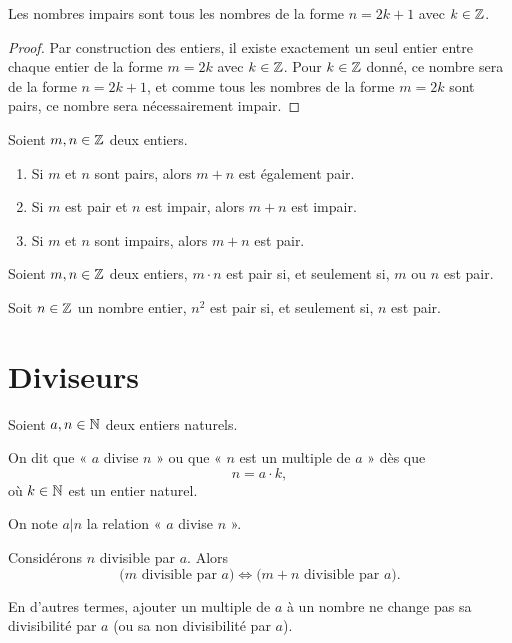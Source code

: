 \documentclass[a4paper, 12pt]{report}
\begin{document}
\begin{thm}
Les nombres impairs sont tous les nombres de la forme $n = 2k + 1$ avec $k \in \mathbb{Z}$. 
\end{thm}

\begin{proof}
Par construction des entiers, il existe exactement un seul entier entre chaque entier de la forme $m = 2k$ avec $k \in \mathbb{Z}$. 
Pour $k \in \mathbb{Z}$ donné, ce nombre sera de la forme $n = 2k +1$, et comme tous les nombres de la forme $m = 2k$ sont pairs,
ce nombre sera nécessairement impair. 
\end{proof}

\begin{thm}
	Soient $m, n\in\mathbb{Z}$ deux entiers.
		\begin{enumerate}
			\item Si $m$ et $n$ sont pairs, alors $m+n$ est également pair.
			\item Si $m$ est pair et $n$ est impair, alors $m+n$ est impair.
			\item Si $m$ et $n$ sont impairs, alors $m+n$ est pair.
		\end{enumerate}
\end{thm}

\begin{thm}
Soient $m, n\in\mathbb{Z}$ deux entiers, $m \cdot n$ est pair si, et seulement si, $m$ ou $n$ est pair.
\end{thm}

\begin{coro}
Soit $n \in \mathbb{Z}$ un nombre entier, $n^2$ est pair si, et seulement si, $n$ est pair.
\end{coro}

\section{Diviseurs}

\begin{defn}
	Soient $a, n \in \mathbb{N}$ deux entiers naturels.
	
	On dit que « $a$ divise $n$ » ou que « $n$ est un multiple de $a$ » dès que
		\[ n = a \cdot k, \]
	où $k\in\mathbb{N}$ est un entier naturel.
\end{defn}

\begin{nota}
	On note $a \big| n$ la relation « $a$ divise $n$ ».
\end{nota}

\begin{prop}
\label{prop:stab}
	Considérons $n$ divisible par $a$. Alors
		\[ \bigl( m \text{ divisible par $a$} \bigr) \iff \bigl( m+n \text{ divisible par $a$} \bigr). \]
	
	En d'autres termes, ajouter un multiple de $a$ à un nombre ne change pas sa divisibilité par $a$ (ou sa non divisibilité par $a$).
\end{prop}
\end{document}
